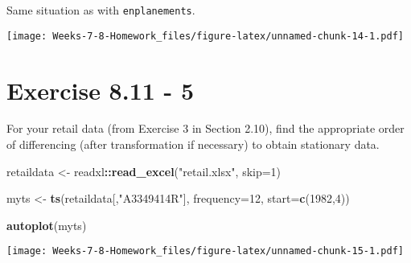 \documentclass[]{article}
\newenvironment{Shaded}{\begin{snugshade}}{\end{snugshade}}
\newcommand{\DataTypeTok}[1]{\textcolor[rgb]{0.13,0.29,0.53}{#1}}
\newcommand{\DecValTok}[1]{\textcolor[rgb]{0.00,0.00,0.81}{#1}}
\newcommand{\KeywordTok}[1]{\textcolor[rgb]{0.13,0.29,0.53}{\textbf{#1}}}
\newcommand{\NormalTok}[1]{#1}
\newcommand{\OperatorTok}[1]{\textcolor[rgb]{0.81,0.36,0.00}{\textbf{#1}}}
\newcommand{\StringTok}[1]{\textcolor[rgb]{0.31,0.60,0.02}{#1}}
\begin{document}
Same situation as with \texttt{enplanements}.

\begin{Shaded}
\end{Shaded}

\texttt{[image: Weeks-7-8-Homework\_files/figure-latex/unnamed-chunk-14-1.pdf]}

\newpage

\hypertarget{exercise-8.11---5}{%
\section{Exercise 8.11 - 5}\label{exercise-8.11---5}}

For your retail data (from Exercise 3 in Section 2.10), find the
appropriate order of differencing (after transformation if necessary) to
obtain stationary data.

\begin{Shaded}
\begin{Highlighting}[]
\NormalTok{retaildata <-}\StringTok{ }\NormalTok{readxl}\OperatorTok{::}\KeywordTok{read_excel}\NormalTok{(}\StringTok{"retail.xlsx"}\NormalTok{, }\DataTypeTok{skip=}\DecValTok{1}\NormalTok{)}

\NormalTok{myts <-}\StringTok{ }\KeywordTok{ts}\NormalTok{(retaildata[,}\StringTok{"A3349414R"}\NormalTok{],}
  \DataTypeTok{frequency=}\DecValTok{12}\NormalTok{, }\DataTypeTok{start=}\KeywordTok{c}\NormalTok{(}\DecValTok{1982}\NormalTok{,}\DecValTok{4}\NormalTok{))}

\KeywordTok{autoplot}\NormalTok{(myts)}
\end{Highlighting}
\end{Shaded}

\texttt{[image: Weeks-7-8-Homework\_files/figure-latex/unnamed-chunk-15-1.pdf]}

\begin{Shaded}
\end{Shaded}
\end{document}
